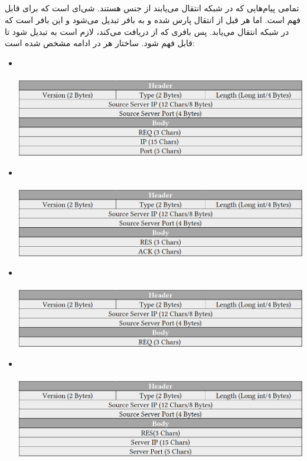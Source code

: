 \documentclass{article}
\begin{document}
\subsection{}
تمامی پیام‌هایی که در شبکه انتقال می‌یابند از جنس  هستند.  شی‌ای است که برای  قابل فهم است. اما هر  قبل از انتقال پارس شده و به بافر تبدیل می‌شود و این بافر است که در شبکه انتقال می‌یابد. پس بافری که  از  دریافت می‌کند، لازم است به  تبدیل شود تا قابل فهم شود.
ساختار هر  در ادامه مشخص شده است:
\begin{itemize}
\newpage
	\item {}\\\\
		\includegraphics{RegisterRequest}
	\item {}\\\\
		\includegraphics{RegisterResponse}	
	\item {}\\\\
		\includegraphics{AdvertiseRequest}	
	\item {}\\\\
		\includegraphics{AdvertiseResponse}	

\end{itemize}
\end{document}
